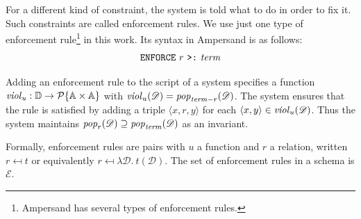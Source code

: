 \documentclass[runningheads]{llncs}
\newcommand{\id}[1]{\text{\it #1\/}}
\newcommand{\popF}[1]{\id{pop}_{#1}}
\newcommand{\pop}[2]{\popF{#1}(#2)}
\newcommand{\viol}[2]{\violC{#1}(#2)}
\newcommand{\violC}[1]{\id{viol}_{#1}}
\newcommand{\powerset}[1]{\cal{P}\{#1\}}
\newcommand{\pair}[2]{\langle{#1},{#2}\rangle}
\newcommand{\Pair}[2]{#1\times#2}
\newcommand{\triple}[3]{\langle{#1},{#2},{#3}\rangle}
\newcommand{\Atoms}{\mathbb{A}}
\newcommand{\enforces}{\mathcal{E}}
\newcommand{\dataset}{\mathscr{D}}
\newcommand{\Dataset}{\mathbb{D}}
\begin{document}
   For a different kind of constraint, the system is told what to do in order to fix it.
   Such constraints are called enforcement rules.
   We use just one type of enforcement rule\footnote{Ampersand has several types of enforcement rules.} in this work.
   Its syntax in Ampersand is as follows:
\begin{align}
      \text{\tt ENFORCE}\ r\ \text{\tt >:}\ \id{term}\label{enforce ins}
\end{align}

   Adding an enforcement rule to the script of a system specifies a function $\violC{u} : \Dataset \to \powerset{\Pair{\Atoms}{\Atoms}}$
   with $\viol{u}{\dataset} = \pop{\id{term} - r}{\dataset}$.
   The system ensures that the rule is satisfied by adding a triple $\triple{x}{r}{y}$ for each $\pair{x}{y} \in \viol{u}{\dataset}$.
   Thus the system maintains $\pop{r}{\dataset} \supseteq \pop{\id{term}}{\dataset}$ as an invariant.
   
   Formally, enforcement rules are pairs with $u$ a function and $r$ a relation, written $r \mapsfrom t$ or equivalently $r \mapsfrom \lambda \dataset.~ t(\dataset)$.
   The set of enforcement rules in a schema is $\enforces$.
   
\end{document}
